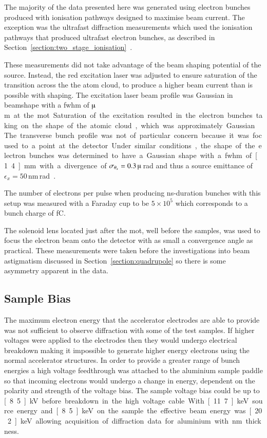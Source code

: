 The majority of the data presented here was generated using electron bunches produced with ionisation pathways designed to maximise beam current.
The exception was the ultrafast diffraction measurements which used the ionisation pathways that produced ultrafast electron bunches, as described in Section~\ref{section:two_stage_ionisation}~\cite{speirs_single-shot_2015,speirs_identification_2017,speirs_electron_2017}.

These measurements did not take advantage of the beam shaping potential of the source.
Instead, the red excitation laser was adjusted to ensure saturation of the transition across the the atom cloud, to produce a higher beam current than is possible with shaping.
The excitation laser beam profile was Gaussian in beamshape with a \gls{fwhm} of \unit[80]{$\muup$m} at the \gls{mot}.
Saturation of the excitation resulted in the electron bunches taking on the shape of the atomic cloud, which was approximately Gaussian.
The transverse bunch profile was not of particular concern because it was focused to a point at the detector.
Under similar conditions, the shape of the electron bunches was determined to have a Gaussian shape with a \gls{fwhm} of \unit[1.4]{mm} with a divergence of $\sigma_{\theta_x}=0.3\,\muup$\,rad and thus a source emittance of $\epsilon_x=50$\,nm\,rad~\cite{mcculloch_high-coherence_2013}.

The number of electrons per pulse when producing ns-duration bunches with this setup was measured with a Faraday cup to be $5\times10^5$ which corresponds to a bunch charge of \unit[80]{fC}.

The solenoid lens located just after the \gls{mot}, well before the samples, was used to focus the electron beam onto the detector with as small a convergence angle as practical.
These measurements were taken before the investigations into beam astigmatism discussed in Section~\ref{section:quadrupole} so there is some asymmetry apparent in the data.

\subsection{Sample Bias}\label{section:sample_bias}

The maximum electron energy that the accelerator electrodes are able to provide was not sufficient to observe diffraction with some of the test samples.
If higher voltages were applied to the electrodes then they would undergo electrical breakdown making it impossible to generate higher energy electrons using the normal accelerator structures.
In order to provide a greater range of bunch energies a high voltage feedthrough was attached to the aluminium sample paddle so that incoming electrons would undergo a change in energy, dependent on the polarity and strength of the voltage bias.
The sample voltage bias could be up to \unit[8.5]{kV} before breakdown in the high voltage cable.
With \unit[11.7]{keV} source energy and \unit[8.5]{keV} on the sample the effective beam energy was \unit[20.2]{keV} allowing acquisition of diffraction data for aluminium with \unit[31]{nm} thickness.

